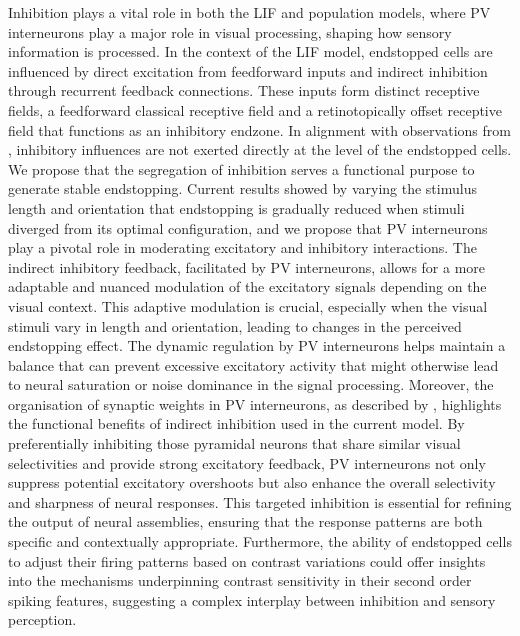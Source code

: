 \documentclass[12pt]{article}
\begin{document}
Inhibition plays a vital role in both the LIF and population models, where PV interneurons play a major role in visual processing, shaping how sensory information is processed. In the context of the LIF model, endstopped cells are influenced by direct excitation from feedforward inputs and indirect inhibition through recurrent feedback connections. These inputs form distinct receptive fields, a feedforward classical receptive field and a retinotopically offset receptive field that functions as an inhibitory endzone. In alignment with observations from \textcite{sillitoContributionExcitatoryInhibitory1977}, inhibitory influences are not exerted directly at the level of the endstopped cells. We propose that the segregation of inhibition serves a functional purpose to generate stable endstopping. Current results showed by varying the stimulus length and orientation that endstopping is gradually reduced when stimuli diverged from its optimal configuration, and we propose that PV interneurons play a pivotal role in moderating excitatory and inhibitory interactions. The indirect inhibitory feedback, facilitated by PV interneurons, allows for a more adaptable and nuanced modulation of the excitatory signals depending on the visual context. This adaptive modulation is crucial, especially when the visual stimuli vary in length and orientation, leading to changes in the perceived endstopping effect. The dynamic regulation by PV interneurons helps maintain a balance that can prevent excessive excitatory activity that might otherwise lead to neural saturation or noise dominance in the signal processing.
\bigbreak
Moreover, the organisation of synaptic weights in PV interneurons, as described by \textcite{znamenskiyFunctionalSpecificityRecurrent2024}, highlights the functional benefits of indirect inhibition used in the current model. By preferentially inhibiting those pyramidal neurons that share similar visual selectivities and provide strong excitatory feedback, PV interneurons not only suppress potential excitatory overshoots but also enhance the overall selectivity and sharpness of neural responses. This targeted inhibition is essential for refining the output of neural assemblies, ensuring that the response patterns are both specific and contextually appropriate. Furthermore, the ability of endstopped cells to adjust their firing patterns based on contrast variations could offer insights into the mechanisms underpinning contrast sensitivity in their second order spiking features, suggesting a complex interplay between inhibition and sensory perception.
\bigbreak
\end{document}
